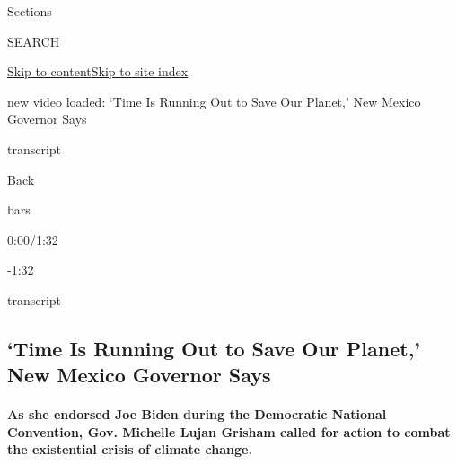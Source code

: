 Sections

SEARCH

\protect\hyperlink{site-content}{Skip to
content}\protect\hyperlink{site-index}{Skip to site index}

new video loaded: `Time Is Running Out to Save Our Planet,' New Mexico
Governor Says

transcript

Back

bars

0:00/1:32

-1:32

transcript

\hypertarget{time-is-running-out-to-save-our-planet-new-mexico-governor-says}{%
\subsection{`Time Is Running Out to Save Our Planet,' New Mexico
Governor
Says}\label{time-is-running-out-to-save-our-planet-new-mexico-governor-says}}

\hypertarget{as-she-endorsed-joe-biden-during-the-democratic-national-convention-gov-michelle-lujan-grisham-called-for-action-to-combat-the-existential-crisis-of-climate-change}{%
\paragraph{As she endorsed Joe Biden during the Democratic National
Convention, Gov. Michelle Lujan Grisham called for action to combat the
existential crisis of climate
change.}\label{as-she-endorsed-joe-biden-during-the-democratic-national-convention-gov-michelle-lujan-grisham-called-for-action-to-combat-the-existential-crisis-of-climate-change}}

